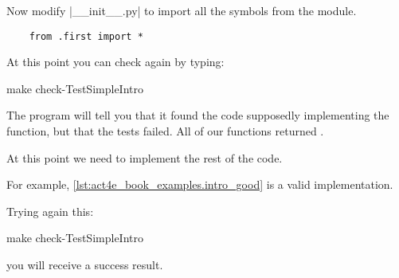 Now modify \files|__init__.py| to import all the symbols from the  module.

\begin{verbatim}
    from .first import *
\end{verbatim}

At this point you can check again by typing:

\begin{console}
    make check-TestSimpleIntro
\end{console}

The program will tell you that it found the code supposedly implementing the function, but that the tests failed.
All of our functions returned .

At this point we need to implement the rest of the code.

For example, \cref{lst:act4e_book_examples.intro_good} is a valid implementation.

\begin{longcode}
    \caption{}
    \label{lst:act4e_book_examples.intro_good}
\end{longcode}

Trying again this:

\begin{console}
    make check-TestSimpleIntro
\end{console}

you will receive a success result.

